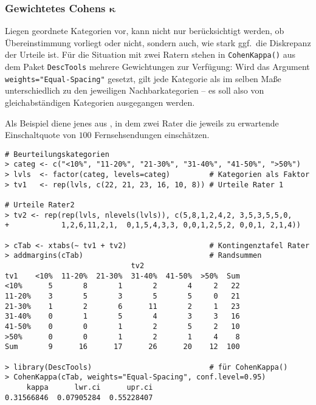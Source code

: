 \subsubsection[Gewichtetes Cohens \texorpdfstring{$\kappa$}{kappa}]{Gewichtetes Cohens $\bm{\kappa}$}

Liegen geordnete Kategorien vor, kann nicht nur berücksichtigt werden, ob Übereinstimmung vorliegt oder nicht, sondern auch, wie stark ggf.\ die Diskrepanz der Urteile ist. Für die Situation mit zwei Ratern stehen in \lstinline!CohenKappa()! aus dem Paket \lstinline!DescTools! mehrere Gewichtungen zur Verfügung: Wird das Argument \lstinline!weights="Equal-Spacing"! gesetzt, gilt jede Kategorie als im selben Maße unterschiedlich zu den jeweiligen Nachbarkategorien -- es soll also von gleichabständigen Kategorien ausgegangen werden.

Als Beispiel diene jenes aus , in dem zwei Rater die jeweils zu erwartende Einschaltquote von $100$ Fernsehsendungen einschätzen.
\begin{lstlisting}
# Beurteilungskategorien
> categ <- c("<10%", "11-20%", "21-30%", "31-40%", "41-50%", ">50%")
> lvls  <- factor(categ, levels=categ)         # Kategorien als Faktor
> tv1   <- rep(lvls, c(22, 21, 23, 16, 10, 8)) # Urteile Rater 1

# Urteile Rater2
> tv2 <- rep(rep(lvls, nlevels(lvls)), c(5,8,1,2,4,2, 3,5,3,5,5,0,
+            1,2,6,11,2,1,  0,1,5,4,3,3, 0,0,1,2,5,2, 0,0,1, 2,1,4))

> cTab <- xtabs(~ tv1 + tv2)                   # Kontingenztafel Rater
> addmargins(cTab)                             # Randsummen
                             tv2
tv1    <10%  11-20%  21-30%  31-40%  41-50%  >50%  Sum
<10%      5       8       1       2       4     2   22
11-20%    3       5       3       5       5     0   21
21-30%    1       2       6      11       2     1   23
31-40%    0       1       5       4       3     3   16
41-50%    0       0       1       2       5     2   10
>50%      0       0       1       2       1     4    8
Sum       9      16      17      26      20    12  100

> library(DescTools)                           # für CohenKappa()
> CohenKappa(cTab, weights="Equal-Spacing", conf.level=0.95)
     kappa      lwr.ci      upr.ci
0.31566846  0.07905284  0.55228407
\end{lstlisting}

